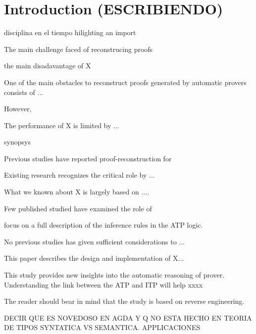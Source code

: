 \documentclass[../main.tex]{subfiles}
\begin{document}

\section{Introduction (ESCRIBIENDO)}
\label{sec:introduction}


disciplina
en el tiempo
hilighting an import

The main challenge faced of reconstrucing proofs

the main disadavantage of X

One of the main obstacles to reconstruct proofs generated by
automatic provers consists of ...

However,

The performance of X is limited by ...

synopsys

Previous studies have reported proof-reconstruction for

Existing research recognizes the critical role by ...

What we known about X is largely based on ....

Few published studied have examined the role of

focus on a full description of the inference rules in the ATP logic.

No previous studies has given sufficient considerations to ...

This paper describes the design and implementation of X...

This study provides new insights into the automatic reasoning of \Metis prover.
Understanding the link between the ATP and ITP will help xxxx

The reader should bear in mind that the study is based on
reverse engineering.

DECIR QUE ES NOVEDOSO EN AGDA Y Q NO ESTA HECHO EN TEORIA DE TIPOS
SYNTATICA VS SEMANTICA.
APPLICACIONES



\end{document}
